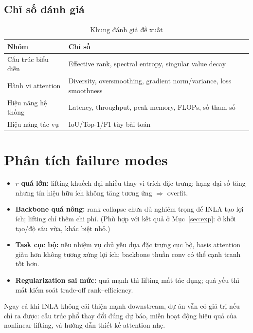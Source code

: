 \documentclass[12pt,a4paper]{article}
\begin{document}
\subsection{Chỉ số đánh giá}
\begin{table}[H]
\centering
\caption{Khung đánh giá đề xuất}
\label{tab:metrics}
\begin{tabular}{@{}p{4cm}p{10cm}@{}}
\toprule
\textbf{Nhóm} & \textbf{Chỉ số} \\
\midrule
Cấu trúc biểu diễn & Effective rank, spectral entropy, singular value decay \\
Hành vi attention & Diversity, oversmoothing, gradient norm/variance, loss smoothness \\
Hiệu năng hệ thống & Latency, throughput, peak memory, FLOPs, số tham số \\
Hiệu năng tác vụ & IoU/Top-1/F1 tùy bài toán \\
\bottomrule
\end{tabular}
\end{table}

\section{Phân tích failure modes}

\begin{itemize}
    \item \textbf{$r$ quá lớn:} lifting khuếch đại nhiễu thay vì trích đặc trưng; hạng đại số tăng
    nhưng tín hiệu hữu ích không tăng tương ứng $\Rightarrow$ overfit.
    \item \textbf{Backbone quá nông:} rank collapse chưa đủ nghiêm trọng để INLA tạo lợi ích; lifting
    chỉ thêm chi phí. (Phù hợp với kết quả ở Mục~\ref{sec:exp}: ở khởi tạo/độ sâu vừa, khác biệt nhỏ.)
    \item \textbf{Task cục bộ:} nếu nhiệm vụ chủ yếu dựa đặc trưng cục bộ, basis attention giàu hơn
    không tương xứng lợi ích; backbone thuần conv có thể cạnh tranh tốt hơn.
    \item \textbf{Regularization sai mức:} quá mạnh thì lifting mất tác dụng; quá yếu thì mất kiểm
    soát trade-off rank--efficiency.
\end{itemize}

Ngay cả khi INLA không cải thiện mạnh downstream, dự án vẫn có giá trị nếu chỉ ra được: cấu trúc phổ
thay đổi đúng dự báo, miền hoạt động hiệu quả của nonlinear lifting, và hướng dẫn thiết kế attention
nhẹ.
\end{document}
